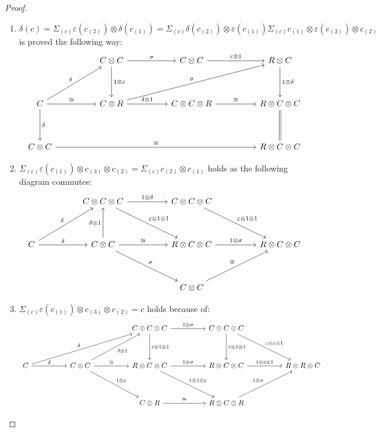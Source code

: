 \documentclass[8pt]{article}
\theoremstyle{definition}
\theoremstyle{definition}
\theoremstyle{definition}
\theoremstyle{definition}
\theoremstyle{definition}
\theoremstyle{definition}
\theoremstyle{definition}
\theoremstyle{definition}
\theoremstyle{definition}
\theoremstyle{definition}
\theoremstyle{definition}
\theoremstyle{definition}
\theoremstyle{definition}
\theoremstyle{definition}
\theoremstyle{question}
\begin{document}
\begin{proof} $ $

  \begin{enumerate}
    \item $\delta(c) = \Sigma_{(c)} \varepsilon(c_{(2)}) \otimes \delta(c_{(1)}) = \Sigma_{(c)} \delta(c_{(2)}) \otimes \varepsilon(c_{(1)}) \Sigma_{(c)} c_{(1)} \otimes \varepsilon(c_{(3)}) \otimes c_{(2)}$ is proved the following way:
    \[
    \begin{tikzcd}
      && C \otimes C \ar[rr, "\sigma"] \ar[dd, "1 \otimes \varepsilon"] && C \otimes C \ar[rr, "\varepsilon \otimes 1"] && R \otimes C \ar[dd, "1 \otimes \delta"] \\
      \\
      C \ar[rr, "\cong"] \ar[uurr, "\delta"]  \ar[dd, "\delta"] && C \otimes R \ar[rr, "\delta \otimes 1"] \ar[uurrrr, "\sigma"] && C \otimes C \otimes R \ar[rr, "\cong"] && R \otimes C \otimes C \\
      \\
      C \otimes C \ar[rrrrrr, "\cong"] &&&&&& R \otimes C \otimes C \ar[uu, equal]
    \end{tikzcd}
    \]
    \item $\Sigma_{(c)} \varepsilon(c_{(1)}) \otimes c_{(3)} \otimes c_{(2)} = \Sigma_{(c)} c_{(2)} \otimes c_{(1)}$ holds as the following diagram commutes:
    \[
    \begin{tikzcd}
      && C \otimes C \otimes C \ar[rr, "1 \otimes \delta"] \ar[ddrr, "\varepsilon \otimes 1 \otimes 1"] && C \otimes C \otimes C \ar[ddrr, "\varepsilon \otimes 1 \otimes 1"] \\
      \\
      C \ar[rr, "\delta"] \ar[uurr, "\delta"] && C \otimes C \ar[uu, "\delta \otimes 1"] \ar[ddrr, "\sigma"] \ar[rr, "\cong"] && R \otimes C \otimes C \ar[rr, "1 \otimes \sigma"] && R \otimes C \otimes C \\
      \\
      &&&& C \otimes C \ar[uurr, "\cong"]
    \end{tikzcd}
    \]
    \item $\Sigma_{(c)} \varepsilon(c_{(1)}) \otimes c_{(3)} \otimes c_{(2)} = c$ holds because of:
    \[
    \begin{tikzcd}
      &&&& C \otimes C \otimes C \ar[rr, "1 \otimes \sigma"] \ar[dd, "\varepsilon \otimes 1 \otimes 1"] && C \otimes C \otimes C \ar[dd, "\varepsilon \otimes 1 \otimes 1"] \ar[ddrr, "\varepsilon \otimes \varepsilon \otimes 1"]\\
      \\
      C \ar[uurrrr, "\delta"] \ar[rr, "\delta"] && C \otimes C \ar[uurr, "\delta \otimes 1"'] \ar[ddrr, "1 \otimes \varepsilon"] \ar[rr, "\cong"] && R \otimes C \otimes C \ar[ddrr, "1 \otimes 1 \otimes \varepsilon"] \ar[rr, "1 \otimes \sigma"] && R \otimes C \otimes C \ar[rr, "1 \otimes \varepsilon \otimes 1"] && R \otimes R \otimes C \\
      \\
      &&&& C \otimes R \ar[rr, "\cong"] && R \otimes C \otimes R \ar[uurr, "1 \otimes \sigma"]
    \end{tikzcd}
    \]
  \end{enumerate}
\end{proof}
\end{document}
